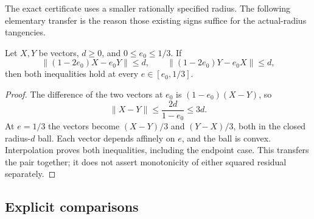 The exact certificate uses a smaller rationally specified radius. The
following elementary transfer is the reason those existing signs suffice
for the actual-radius tangencies.

\begin{lemma}
\label{lem:paired-radius-transfer}
Let $X,Y$ be vectors, $d\ge0$, and $0\le e_0\le1/3$. If
\[
 \|(1-2e_0)X-e_0Y\|\le d,\qquad
 \|(1-2e_0)Y-e_0X\|\le d,
\]
then both inequalities hold at every $e\in[e_0,1/3]$.
\end{lemma}

\begin{proof}
The difference of the two vectors at $e_0$ is $(1-e_0)(X-Y)$, so
\[
 \|X-Y\|\le\frac{2d}{1-e_0}\le3d.
\]
At $e=1/3$ the vectors become $(X-Y)/3$ and $(Y-X)/3$, both in the
closed radius-$d$ ball. Each vector depends affinely on $e$, and the ball
is convex. Interpolation proves both inequalities, including the endpoint
case. This transfers the pair together; it does not assert monotonicity of
either squared residual separately.
\end{proof}

\subsection{Explicit comparisons}
\label{sec:strategy4-exact-certificate}
\let\Fcertificateheading\subsubsection


